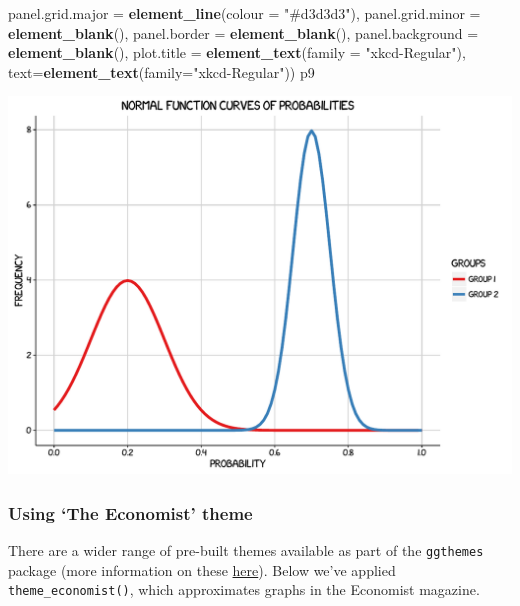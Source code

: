 \documentclass[]{article}
\newenvironment{Shaded}{\begin{snugshade}}{\end{snugshade}}
\newcommand{\KeywordTok}[1]{\textcolor[rgb]{0.13,0.29,0.53}{\textbf{{#1}}}}
\newcommand{\DataTypeTok}[1]{\textcolor[rgb]{0.13,0.29,0.53}{{#1}}}
\newcommand{\StringTok}[1]{\textcolor[rgb]{0.31,0.60,0.02}{{#1}}}
\newcommand{\NormalTok}[1]{{#1}}
\begin{document}
\begin{Shaded}
\begin{Highlighting}[]
            \DataTypeTok{panel.grid.major =} \KeywordTok{element_line}\NormalTok{(}\DataTypeTok{colour =} \StringTok{"#d3d3d3"}\NormalTok{), }
            \DataTypeTok{panel.grid.minor =} \KeywordTok{element_blank}\NormalTok{(), }
            \DataTypeTok{panel.border =} \KeywordTok{element_blank}\NormalTok{(), }\DataTypeTok{panel.background =} \KeywordTok{element_blank}\NormalTok{(),}
            \DataTypeTok{plot.title =} \KeywordTok{element_text}\NormalTok{(}\DataTypeTok{family =} \StringTok{"xkcd-Regular"}\NormalTok{),}
            \DataTypeTok{text=}\KeywordTok{element_text}\NormalTok{(}\DataTypeTok{family=}\StringTok{"xkcd-Regular"}\NormalTok{))}
\NormalTok{p9}
\end{Highlighting}
\end{Shaded}

\begin{center}\includegraphics{0_all_posts_pdf/function_14-1} \end{center}

\subsubsection{\texorpdfstring{Using `The Economist'
theme}{Using The Economist theme}}\label{using-the-economist-theme-8}

There are a wider range of pre-built themes available as part of the
\texttt{ggthemes} package (more information on these
\href{https://cran.r-project.org/web/packages/ggthemes/vignettes/ggthemes.html}{here}).
Below we've applied \texttt{theme\_economist()}, which approximates
graphs in the Economist magazine.
\end{document}
